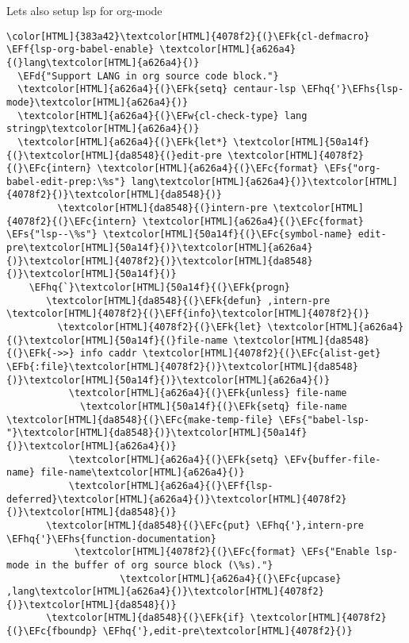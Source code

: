 \documentclass{scrartcl}
\newcommand{\EFk}[1]{\textcolor{EFk}{#1}} %
\newcommand{\EFd}[1]{\textcolor{EFd}{\textit{#1}}} %
\newcommand{\EFs}[1]{\textcolor{EFs}{#1}} %
\newcommand{\EFw}[1]{\textcolor{EFw}{#1}} %
\newcommand{\EFb}[1]{\textcolor{EFb}{#1}} %
\newcommand{\EFc}[1]{\textcolor{EFc}{#1}} %
\newcommand{\EFv}[1]{\textcolor{EFv}{#1}} %
\newcommand{\EFf}[1]{\textcolor{EFf}{#1}} %
\newcommand{\EFhq}[1]{\textcolor{EFhq}{#1}} %
\newcommand{\EFhs}[1]{\textcolor{EFhs}{#1}} %
\begin{document}
Lets also setup lsp for org-mode
\begin{Code}
\begin{Verbatim}[]
\color[HTML]{383a42}\textcolor[HTML]{4078f2}{(}\EFk{cl-defmacro} \EFf{lsp-org-babel-enable} \textcolor[HTML]{a626a4}{(}lang\textcolor[HTML]{a626a4}{)}
  \EFd{"Support LANG in org source code block."}
  \textcolor[HTML]{a626a4}{(}\EFk{setq} centaur-lsp \EFhq{'}\EFhs{lsp-mode}\textcolor[HTML]{a626a4}{)}
  \textcolor[HTML]{a626a4}{(}\EFw{cl-check-type} lang stringp\textcolor[HTML]{a626a4}{)}
  \textcolor[HTML]{a626a4}{(}\EFk{let*} \textcolor[HTML]{50a14f}{(}\textcolor[HTML]{da8548}{(}edit-pre \textcolor[HTML]{4078f2}{(}\EFc{intern} \textcolor[HTML]{a626a4}{(}\EFc{format} \EFs{"org-babel-edit-prep:\%s"} lang\textcolor[HTML]{a626a4}{)}\textcolor[HTML]{4078f2}{)}\textcolor[HTML]{da8548}{)}
         \textcolor[HTML]{da8548}{(}intern-pre \textcolor[HTML]{4078f2}{(}\EFc{intern} \textcolor[HTML]{a626a4}{(}\EFc{format} \EFs{"lsp--\%s"} \textcolor[HTML]{50a14f}{(}\EFc{symbol-name} edit-pre\textcolor[HTML]{50a14f}{)}\textcolor[HTML]{a626a4}{)}\textcolor[HTML]{4078f2}{)}\textcolor[HTML]{da8548}{)}\textcolor[HTML]{50a14f}{)}
    \EFhq{`}\textcolor[HTML]{50a14f}{(}\EFk{progn}
       \textcolor[HTML]{da8548}{(}\EFk{defun} ,intern-pre \textcolor[HTML]{4078f2}{(}\EFf{info}\textcolor[HTML]{4078f2}{)}
         \textcolor[HTML]{4078f2}{(}\EFk{let} \textcolor[HTML]{a626a4}{(}\textcolor[HTML]{50a14f}{(}file-name \textcolor[HTML]{da8548}{(}\EFk{->>} info caddr \textcolor[HTML]{4078f2}{(}\EFc{alist-get} \EFb{:file}\textcolor[HTML]{4078f2}{)}\textcolor[HTML]{da8548}{)}\textcolor[HTML]{50a14f}{)}\textcolor[HTML]{a626a4}{)}
           \textcolor[HTML]{a626a4}{(}\EFk{unless} file-name
             \textcolor[HTML]{50a14f}{(}\EFk{setq} file-name \textcolor[HTML]{da8548}{(}\EFc{make-temp-file} \EFs{"babel-lsp-"}\textcolor[HTML]{da8548}{)}\textcolor[HTML]{50a14f}{)}\textcolor[HTML]{a626a4}{)}
           \textcolor[HTML]{a626a4}{(}\EFk{setq} \EFv{buffer-file-name} file-name\textcolor[HTML]{a626a4}{)}
           \textcolor[HTML]{a626a4}{(}\EFf{lsp-deferred}\textcolor[HTML]{a626a4}{)}\textcolor[HTML]{4078f2}{)}\textcolor[HTML]{da8548}{)}
       \textcolor[HTML]{da8548}{(}\EFc{put} \EFhq{'},intern-pre \EFhq{'}\EFhs{function-documentation}
            \textcolor[HTML]{4078f2}{(}\EFc{format} \EFs{"Enable lsp-mode in the buffer of org source block (\%s)."}
                    \textcolor[HTML]{a626a4}{(}\EFc{upcase} ,lang\textcolor[HTML]{a626a4}{)}\textcolor[HTML]{4078f2}{)}\textcolor[HTML]{da8548}{)}
       \textcolor[HTML]{da8548}{(}\EFk{if} \textcolor[HTML]{4078f2}{(}\EFc{fboundp} \EFhq{'},edit-pre\textcolor[HTML]{4078f2}{)}

\end{Verbatim}
\end{Code}
\end{document}
